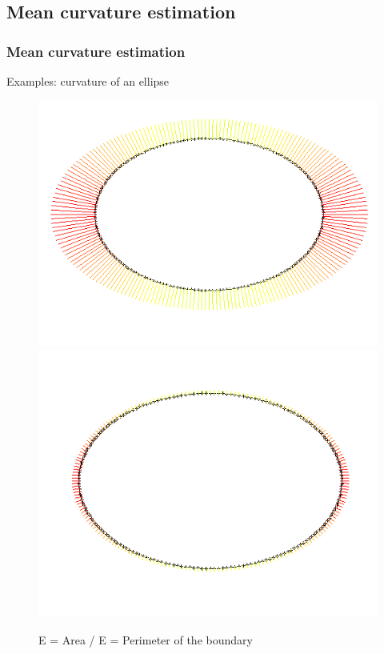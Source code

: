 \documentclass{beamer}
\begin{document}
\subsection{Mean curvature estimation}
\begin{frame}
    \frametitle{Mean curvature estimation}

    Examples: curvature of an ellipse
    \begin{figure}
        \centering
        \includegraphics[scale=0.3]{img/curvature-ellipse-200-15-area}
        \includegraphics[scale=0.3]{img/curvature-ellipse-200-15-perimeter}
        \caption{E = Area / E = Perimeter of the boundary}
    \end{figure}
\end{frame}
\end{document}
